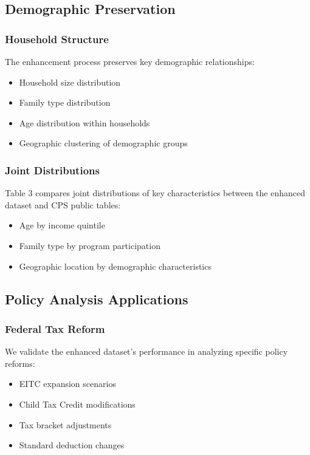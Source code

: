 \subsection{Demographic Preservation}

\subsubsection{Household Structure}

The enhancement process preserves key demographic relationships:
\begin{itemize}
    \item Household size distribution
    \item Family type distribution
    \item Age distribution within households
    \item Geographic clustering of demographic groups
\end{itemize}

\subsubsection{Joint Distributions}

Table 3 compares joint distributions of key characteristics between the enhanced dataset and CPS public tables:
\begin{itemize}
    \item Age by income quintile
    \item Family type by program participation
    \item Geographic location by demographic characteristics
\end{itemize}

\subsection{Policy Analysis Applications}

\subsubsection{Federal Tax Reform}

We validate the enhanced dataset's performance in analyzing specific policy reforms:
\begin{itemize}
    \item EITC expansion scenarios
    \item Child Tax Credit modifications
    \item Tax bracket adjustments
    \item Standard deduction changes
\end{itemize}

